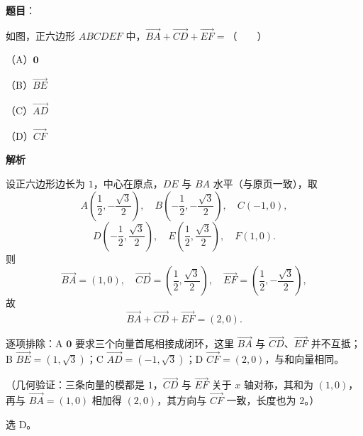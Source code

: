 \begin{answer}

\textbf{题目}：

如图，正六边形 $ABCDEF$ 中，$\overrightarrow{BA}+\overrightarrow{CD}+\overrightarrow{EF}=$\mbox{（　　）}

（A）$\boldsymbol 0$

（B）$\overrightarrow{BE}$

（C）$\overrightarrow{AD}$

（D）$\overrightarrow{CF}$
\nopagebreak[4]
\begin{center}\end{center}
\nopagebreak[4]
\textbf{解析}

设正六边形边长为 $1$，中心在原点，$DE$ 与 $BA$ 水平（与原页一致），取
\nopagebreak[4]
\[
A\left(\frac12,-\frac{\sqrt3}{2}\right),\quad B\left(-\frac12,-\frac{\sqrt3}{2}\right),\quad C(-1,0),
\]
\nopagebreak[4]
\[
D\left(-\frac12,\frac{\sqrt3}{2}\right),\quad E\left(\frac12,\frac{\sqrt3}{2}\right),\quad F(1,0).
\]
则
\nopagebreak[4]
\[
\overrightarrow{BA}=\left(1,0\right),\quad
\overrightarrow{CD}=\left(\frac12,\frac{\sqrt3}{2}\right),\quad
\overrightarrow{EF}=\left(\frac12,-\frac{\sqrt3}{2}\right),
\]
故
\nopagebreak[4]
\[
\overrightarrow{BA}+\overrightarrow{CD}+\overrightarrow{EF}=(2,0).
\]

逐项排除：A $\boldsymbol 0$ 要求三个向量首尾相接成闭环，这里 $\overrightarrow{BA}$ 与 $\overrightarrow{CD}$、$\overrightarrow{EF}$ 并不互抵；B $\overrightarrow{BE}=\left(1,\sqrt3\right)$；C $\overrightarrow{AD}=(-1,\sqrt3)$；D $\overrightarrow{CF}=(2,0)$，与和向量相同。

（几何验证：三条向量的模都是 $1$，$\overrightarrow{CD}$ 与 $\overrightarrow{EF}$ 关于 $x$ 轴对称，其和为 $(1,0)$，再与 $\overrightarrow{BA}=(1,0)$ 相加得 $(2,0)$，其方向与 $\overrightarrow{CF}$ 一致，长度也为 $2$。）

选 D。


\end{answer}
